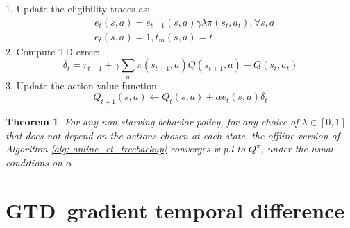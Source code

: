 \documentclass[11pt,a4paper]{article}
\newtheorem{theorem}{Theorem}[subsection]
\begin{document}
\begin{tcolorbox}[title=Online Eligibility-Trace Version of Tree Backup]
\label{alg: online_et_treebackup}
1. Update the eligibility traces as:
\begin{eqnarray}
& e_t(s,a) = e_{t-1}(s,a)\gamma\lambda \pi(s_t,a_t), \forall s,a \\ 
& e_t(s,a) = 1, t_m(s,a) = t
\end{eqnarray}
2. Compute TD error:
\begin{equation}
\delta_t = r_{t+1} + \gamma \sum_a \pi(s_{t+1}, a) Q(s_{t+1}, a) - Q(s_t, a_t)
\end{equation}
3. Update the action-value function:
\begin{equation}
Q_{t+1}(s,a) \leftarrow Q_t(s,a) + \alpha e_t(s,a) \delta_t
\end{equation}
\end{tcolorbox}

\begin{theorem}
\label{th:et_th2}
For any non-starving behavior policy, for any choice of $\lambda \in [0,1]$ that does not depend on the actions chosen at each state, the offline version of Algorithm \ref{alg: online_et_treebackup} converges w.p.l to $Q^{\pi}$, under the usual conditions on $\alpha$.
\end{theorem}


\section{GTD--gradient temporal difference}
\end{document}
